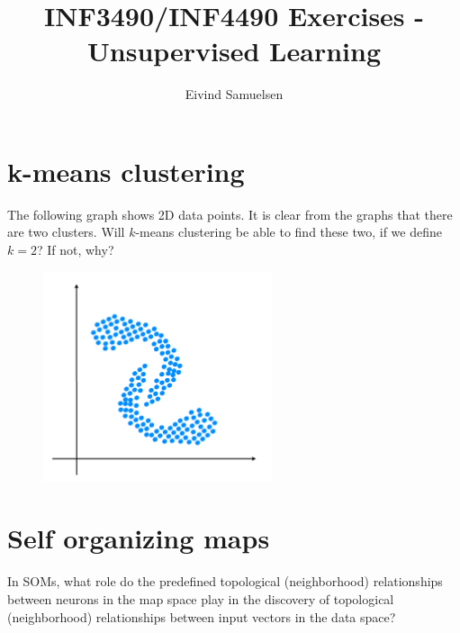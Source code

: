 
\title{\vspace{-2cm}INF3490/INF4490 Exercises - Unsupervised Learning}
\author{Eivind Samuelsen}
\date{}

\setlength\parindent{0pt}


    \renewcommand\marginsymbol[1][0pt]{%
  \tabto*{0cm}\makebox[-1cm][c]{$\mathbb{P}$}\tabto*{\TabPrevPos}}

\maketitle


\section{k-means clustering}
The following graph shows 2D data points. It is clear from the graphs that there are two clusters. Will \(k\)-means clustering be able to find these two, if we define \(k = 2\)? If not, why?
\begin{figure}[H]
\begin{center}
\includegraphics[width=0.6\textwidth]{two_clusters.png}
\end{center}
\end{figure}

\section{Self organizing maps}
In SOMs, what role do the predefined topological (neighborhood) relationships between neurons in the map space play in the discovery of topological (neighborhood) relationships between input vectors in the data space?

